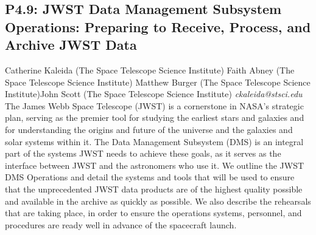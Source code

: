 \documentclass{report}
\begin{document}
\subsection*{P4.9: JWST Data Management Subsystem Operations:  Preparing to Receive, Process, and Archive JWST Data}
\bigskip
Catherine Kaleida (The Space Telescope Science Institute) \newline Faith Abney (The Space Telescope Science Institute) \newline  Matthew Burger (The Space Telescope Science Institute)\newline  John Scott (The Space Telescope Science Institute)\newline  \newline  \newline\newline
{\it ckaleida@stsci.edu}\newline
\newline\newline
The James Webb Space Telescope (JWST) is a cornerstone in NASA's strategic plan, serving as the premier tool for studying the earliest stars and galaxies and for understanding the origins and future of the universe and the galaxies and solar systems within it. The Data Management Subsystem (DMS) is an integral part of the systems JWST needs to achieve these goals, as it serves as the interface between JWST and the astronomers who use it.  We outline the JWST DMS Operations and detail the systems and tools that will be used to ensure that the unprecedented JWST data products are of the highest quality possible and available in the archive as quickly as possible.  We also describe the rehearsals that are taking place, in order to ensure the operations systems, personnel, and procedures are ready well in advance of the spacecraft launch.\newline
\newpage
\end{document}
